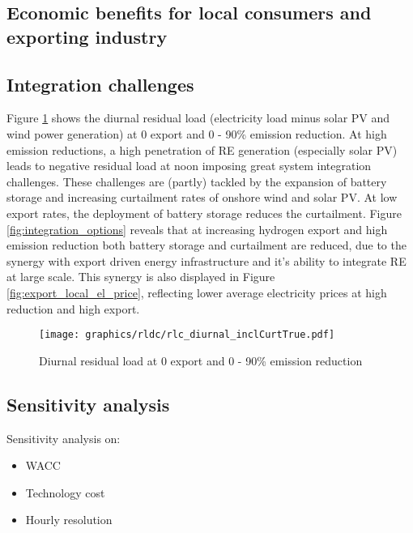 \subsection{Economic benefits for local consumers and exporting industry}
\label{subsec:economic_benefits}

\subsection{Integration challenges}
\label{subsec:integration_challenges}
Figure \ref{fig:diurnal} shows the diurnal residual load (electricity load minus solar PV and wind power generation) at 0 export and 0 - 90\% emission reduction. At high emission reductions, a high penetration of RE generation (especially solar PV) 
leads to negative residual load at noon imposing great system integration challenges.
These challenges are (partly) tackled by the expansion of battery storage and increasing curtailment rates of onshore wind and solar PV. At low export rates, the deployment of battery storage reduces the curtailment. Figure \ref{fig:integration_options}
reveals that at increasing hydrogen export and high emission reduction both battery storage and curtailment are reduced, due to the synergy with export driven energy infrastructure and it's ability to integrate RE at large scale.
This synergy is also displayed in Figure \ref{fig:export_local_el_price}, reflecting lower average electricity prices at high reduction and high export.

\begin{figure}[h!]
    \centering
    \texttt{[image: graphics/rldc/rlc\_diurnal\_inclCurtTrue.pdf]}
    \caption{Diurnal residual load at 0 export and 0 - 90\% emission reduction}
    \label{fig:diurnal}
\end{figure}

\subsection{Sensitivity analysis}
\label{subsec:sensitivity}
Sensitivity analysis on:
\begin{itemize}
    \item WACC
    \item Technology cost
    \item Hourly resolution
\end{itemize}


